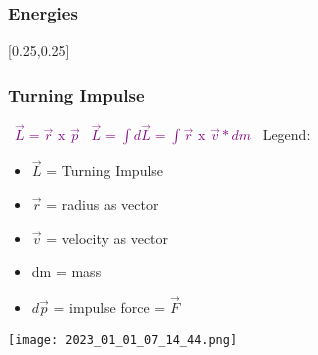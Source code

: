 \documentclass[main.tex,fontsize=8pt,paper=a4,paper=portrait,DIV=calc,]{scrartcl}
\begin{document}
\begin{multicols*}{2}
\subsubsection{Energies}
[0.25,0.25]

\subsubsection{Turning Impulse}
\, \newline
\large \textcolor{purple}{\( \vec{L} = \vec{r} \text{ x } \vec{p} \)}\newline
\, \newline
\large \textcolor{purple}{\( \vec{L} = \int{d\vec{L}} = \int{\vec{r} \text{ x } \vec{v} * dm} \)}\newline
\, \newline
\normalsize Legend: \newline
\begin{itemize}
  \item \(\vec{L}\) = Turning Impulse
  \item \(\vec{r}\) = radius as vector
  \item \(\vec{v}\) = velocity as vector 
\item dm = mass
\item \(d\vec{p}\) = impulse force = \(\vec{F}\)
\end{itemize} 
\texttt{[image: 2023\_01\_01\_07\_14\_44.png]}


\end{multicols*}
\end{document}
